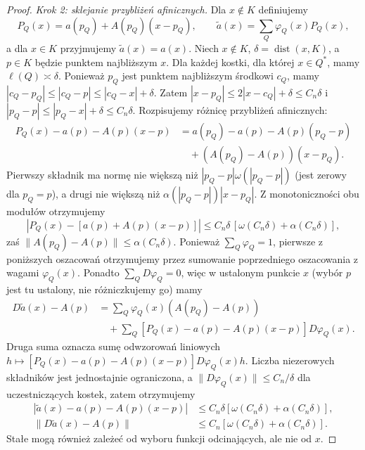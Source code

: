 \begin{proof}
\emph{Krok 2: sklejanie przybliżeń afinicznych.}
Dla $x\notin K$ definiujemy
\[
 P_Q(x)=a(p_Q)+A(p_Q)(x-p_Q),\qquad
 \widetilde a(x)=\sum_Q\varphi_Q(x)P_Q(x),
\]
a dla $x\in K$ przyjmujemy $\widetilde a(x)=a(x)$.
Niech $x\notin K$, $\delta=\operatorname{dist}(x,K)$,
a $p\in K$ będzie punktem najbliższym $x$.
Dla każdej kostki, dla której $x\in Q^*$,
mamy $\ell(Q)\asymp\delta$. Ponieważ $p_Q$ jest
punktem najbliższym środkowi $c_Q$, mamy
$|c_Q-p_Q|\le|c_Q-p|\le |c_Q-x|+\delta$.
Zatem $|x-p_Q|\le 2|x-c_Q|+\delta\le C_n\delta$
i $|p_Q-p|\le |p_Q-x|+\delta\le C_n\delta$.
Rozpisujemy różnicę przybliżeń afinicznych:
\begin{align*}
 P_Q(x)-a(p)-A(p)(x-p)
 &=a(p_Q)-a(p)-A(p)(p_Q-p)\\
 &\quad+(A(p_Q)-A(p))(x-p_Q).
\end{align*}
Pierwszy składnik ma normę nie większą niż
$|p_Q-p|\omega(|p_Q-p|)$ (jest zerowy dla $p_Q=p$),
a drugi nie większą niż
$\alpha(|p_Q-p|)|x-p_Q|$.
Z monotoniczności obu modułów otrzymujemy
\[
 |P_Q(x)-[a(p)+A(p)(x-p)]|
 \le C_n\delta\,[\omega(C_n\delta)+\alpha(C_n\delta)],
\]
zaś $\|A(p_Q)-A(p)\|\le\alpha(C_n\delta)$.
Ponieważ $\sum_Q\varphi_Q=1$, pierwsze z poniższych
oszacowań otrzymujemy przez sumowanie poprzedniego
oszacowania z wagami $\varphi_Q(x)$.
Ponadto $\sum_QD\varphi_Q=0$, więc w ustalonym punkcie $x$
(wybór $p$ jest tu ustalony, nie różniczkujemy go) mamy
\begin{align*}
 D\widetilde a(x)-A(p)
 &=\sum_Q\varphi_Q(x)(A(p_Q)-A(p))\\
 &\quad+\sum_Q [P_Q(x)-a(p)-A(p)(x-p)]D\varphi_Q(x).
\end{align*}
Druga suma oznacza sumę odwzorowań liniowych
$h\mapsto [P_Q(x)-a(p)-A(p)(x-p)]D\varphi_Q(x)h$.
Liczba niezerowych składników jest jednostajnie ograniczona,
a $\|D\varphi_Q(x)\|\le C_n/\delta$ dla uczestniczących
kostek, zatem otrzymujemy
\begin{align*}
 |\widetilde a(x)-a(p)-A(p)(x-p)|
 &\le C_n\delta[\omega(C_n\delta)+\alpha(C_n\delta)],\\
 \|D\widetilde a(x)-A(p)\|
 &\le C_n[\omega(C_n\delta)+\alpha(C_n\delta)].
\end{align*}
Stałe mogą również zależeć od wyboru funkcji
odcinających, ale nie od $x$.


\end{proof}
